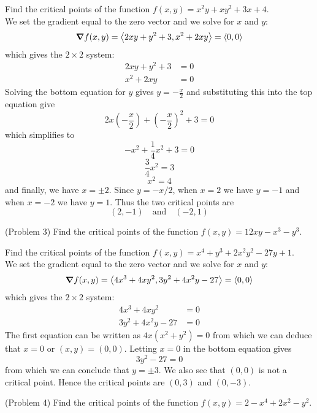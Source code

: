 \documentclass[handout]{ximera}
\begin{document}
\begin{example}[Example 3]
Find the critical points of the function $f(x,y) = x^2y +xy^2 +3x + 4$.\\
We set the gradient equal to the zero vector and we solve for $x$ and $y$:
\[
\boldsymbol\nabla f(x,y) = \left\langle 2xy + y^2 + 3, x^2 + 2xy\right\rangle = \left\langle 0,0\right\rangle
\]
which gives the $2 \times 2$ system:
\begin{align*}
2xy + y^2 +3  &= 0\\
x^2 + 2xy & = 0
\end{align*}
Solving the bottom equation for $y$ gives $y = -\frac{x}{2}$ and substituting this into the top equation give
\[
2x\left(-\frac{x}{2}\right) + \left(-\frac{x}{2}\right)^2 +3 = 0
\]
which simplifies to
\[
-x^2 + \frac14 x^2 + 3 =0
\]
\[
\frac34 x^2 = 3
\]
\[
x^2 = 4
\]
and finally, we have $x=\pm 2$. Since $y = -x/2$, when $x=2$ we have $y=-1$ and when $x = -2$ we have $y = 1$.
Thus the two critical points are
\[
(2,-1) \quad \text{and} \quad (-2, 1)
\]
\end{example}

\begin{problem}(Problem 3)
Find the critical points of the function $f(x,y) = 12xy - x^3 - y^3$.
\end{problem}



\begin{example}[Example 4]
Find the critical points of the function $f(x,y) = x^4 + y^3 + 2x^2y^2 -27y + 1$.\\
We set the gradient equal to the zero vector and we solve for $x$ and $y$:
\[
\boldsymbol\nabla f(x,y) = \left\langle 4x^3 + 4xy^2, 3y^2 + 4x^2y -27\right\rangle = \left\langle 0,0\right\rangle
\]
which gives the $2 \times 2$ system:
\begin{align*}
4x^3 + 4xy^2 &= 0\\
3y^2 + 4x^2y -27 &= 0
\end{align*}
The first equation can be written as $4x(x^2 + y^2) = 0$ from which we can deduce that $x = 0$ or $(x, y) = (0,0)$. 
Letting $x = 0$ in the bottom equation gives
\[
3y^2 - 27 = 0
\]
from which we can conclude that $y = \pm 3$. We also see that $(0,0)$ is not a critical point.
Hence the critical points are $(0, 3)$ and $(0, -3)$.
\end{example}

\begin{problem}(Problem 4)
Find the critical points of the function $f(x,y) = 2-x^4 + 2x^2 - y^2$.
\end{problem}
\end{document}
